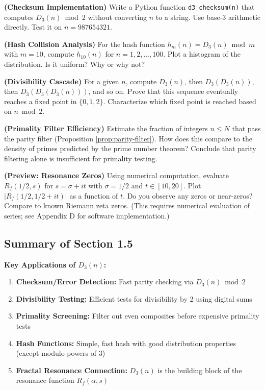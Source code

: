 \begin{exercise}
\textbf{(Checksum Implementation)} Write a Python function \texttt{d3\_checksum(n)} that computes $D_3(n) \bmod 2$ without converting $n$ to a string. Use base-3 arithmetic directly. Test it on $n = 987654321$.
\end{exercise}

\begin{exercise}
\textbf{(Hash Collision Analysis)} For the hash function $h_m(n) = D_3(n) \bmod m$ with $m = 10$, compute $h_{10}(n)$ for $n = 1, 2, \ldots, 100$. Plot a histogram of the distribution. Is it uniform? Why or why not?
\end{exercise}

\begin{exercise}
\textbf{(Divisibility Cascade)} For a given $n$, compute $D_3(n)$, then $D_3(D_3(n))$, then $D_3(D_3(D_3(n)))$, and so on. Prove that this sequence eventually reaches a fixed point in $\{0, 1, 2\}$. Characterize which fixed point is reached based on $n \bmod 2$.
\end{exercise}

\begin{exercise}
\textbf{(Primality Filter Efficiency)} Estimate the fraction of integers $n \leq N$ that pass the parity filter (Proposition \ref{prop:parity-filter}). How does this compare to the density of primes predicted by the prime number theorem? Conclude that parity filtering alone is insufficient for primality testing.
\end{exercise}

\begin{exercise}
\textbf{(Preview: Resonance Zeros)} Using numerical computation, evaluate $R_f(1/2, s)$ for $s = \sigma + it$ with $\sigma = 1/2$ and $t \in [10, 20]$. Plot $|R_f(1/2, 1/2 + it)|$ as a function of $t$. Do you observe any zeros or near-zeros? Compare to known Riemann zeta zeros. (This requires numerical evaluation of series; see Appendix D for software implementation.)
\end{exercise}

\subsection{Summary of Section 1.5}

\textbf{Key Applications of $D_3(n)$:}
\begin{enumerate}
\item \textbf{Checksum/Error Detection:} Fast parity checking via $D_3(n) \bmod 2$
\item \textbf{Divisibility Testing:} Efficient tests for divisibility by 2 using digital sums
\item \textbf{Primality Screening:} Filter out even composites before expensive primality tests
\item \textbf{Hash Functions:} Simple, fast hash with good distribution properties (except modulo powers of 3)
\item \textbf{Fractal Resonance Connection:} $D_3(n)$ is the building block of the resonance function $R_f(\alpha, s)$
\end{enumerate}

